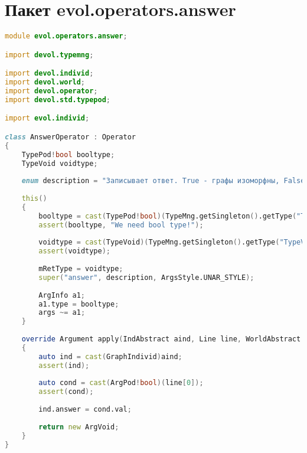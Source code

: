 \documentclass[russian,utf8,emptystyle]{eskdtext}
\begin{document}
\section{Пакет evol.operators.answer}
\begin{lstlisting}[language=D]
module evol.operators.answer;

import devol.typemng;

import devol.individ;
import devol.world;
import devol.operator;  
import devol.std.typepod;

import evol.individ;

class AnswerOperator : Operator
{
    TypePod!bool booltype;
    TypeVoid voidtype;
    
    enum description = "Записывает ответ. True - графы изоморфны, False - не изоморфны.";
    
    this()
    {
        booltype = cast(TypePod!bool)(TypeMng.getSingleton().getType("Typebool"));
        assert(booltype, "We need bool type!");
        
        voidtype = cast(TypeVoid)(TypeMng.getSingleton().getType("TypeVoid"));
        assert(voidtype);
        
        mRetType = voidtype;
        super("answer", description, ArgsStyle.UNAR_STYLE);
        
        ArgInfo a1;
        a1.type = booltype;
        args ~= a1;
    }
    
    override Argument apply(IndAbstract aind, Line line, WorldAbstract world)
    {
        auto ind = cast(GraphIndivid)aind;
        assert(ind);
        
        auto cond = cast(ArgPod!bool)(line[0]);
        assert(cond);
 
        ind.answer = cond.val;
        
        return new ArgVoid;
    }   
}

\end{lstlisting}
\end{document}
